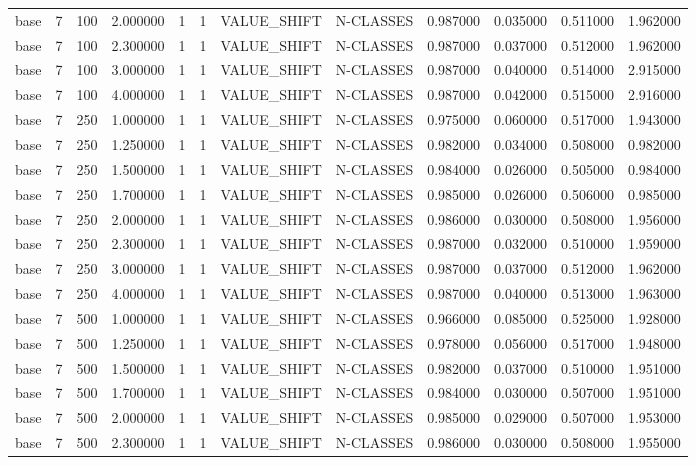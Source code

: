 \begin{tabular}{lrrrllllrrrr}
base & 7 & 100 & 2.000000 & 1 & 1 & VALUE_SHIFT & N-CLASSES & 0.987000 & 0.035000 & 0.511000 & 1.962000 \\
base & 7 & 100 & 2.300000 & 1 & 1 & VALUE_SHIFT & N-CLASSES & 0.987000 & 0.037000 & 0.512000 & 1.962000 \\
base & 7 & 100 & 3.000000 & 1 & 1 & VALUE_SHIFT & N-CLASSES & 0.987000 & 0.040000 & 0.514000 & 2.915000 \\
base & 7 & 100 & 4.000000 & 1 & 1 & VALUE_SHIFT & N-CLASSES & 0.987000 & 0.042000 & 0.515000 & 2.916000 \\
base & 7 & 250 & 1.000000 & 1 & 1 & VALUE_SHIFT & N-CLASSES & 0.975000 & 0.060000 & 0.517000 & 1.943000 \\
base & 7 & 250 & 1.250000 & 1 & 1 & VALUE_SHIFT & N-CLASSES & 0.982000 & 0.034000 & 0.508000 & 0.982000 \\
base & 7 & 250 & 1.500000 & 1 & 1 & VALUE_SHIFT & N-CLASSES & 0.984000 & 0.026000 & 0.505000 & 0.984000 \\
base & 7 & 250 & 1.700000 & 1 & 1 & VALUE_SHIFT & N-CLASSES & 0.985000 & 0.026000 & 0.506000 & 0.985000 \\
base & 7 & 250 & 2.000000 & 1 & 1 & VALUE_SHIFT & N-CLASSES & 0.986000 & 0.030000 & 0.508000 & 1.956000 \\
base & 7 & 250 & 2.300000 & 1 & 1 & VALUE_SHIFT & N-CLASSES & 0.987000 & 0.032000 & 0.510000 & 1.959000 \\
base & 7 & 250 & 3.000000 & 1 & 1 & VALUE_SHIFT & N-CLASSES & 0.987000 & 0.037000 & 0.512000 & 1.962000 \\
base & 7 & 250 & 4.000000 & 1 & 1 & VALUE_SHIFT & N-CLASSES & 0.987000 & 0.040000 & 0.513000 & 1.963000 \\
base & 7 & 500 & 1.000000 & 1 & 1 & VALUE_SHIFT & N-CLASSES & 0.966000 & 0.085000 & 0.525000 & 1.928000 \\
base & 7 & 500 & 1.250000 & 1 & 1 & VALUE_SHIFT & N-CLASSES & 0.978000 & 0.056000 & 0.517000 & 1.948000 \\
base & 7 & 500 & 1.500000 & 1 & 1 & VALUE_SHIFT & N-CLASSES & 0.982000 & 0.037000 & 0.510000 & 1.951000 \\
base & 7 & 500 & 1.700000 & 1 & 1 & VALUE_SHIFT & N-CLASSES & 0.984000 & 0.030000 & 0.507000 & 1.951000 \\
base & 7 & 500 & 2.000000 & 1 & 1 & VALUE_SHIFT & N-CLASSES & 0.985000 & 0.029000 & 0.507000 & 1.953000 \\
base & 7 & 500 & 2.300000 & 1 & 1 & VALUE_SHIFT & N-CLASSES & 0.986000 & 0.030000 & 0.508000 & 1.955000 \\

\end{tabular}
